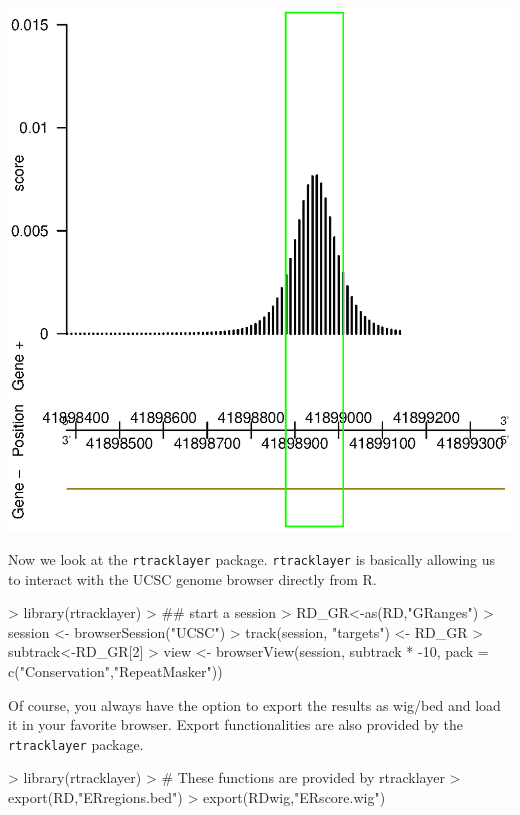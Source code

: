 \documentclass[12pt]{article}
\newcommand{\Rpackage}[1]{\texttt{#1}}
\begin{document}
\includegraphics{chipData_AD-Visualization-GenomeGraphs-cs}

Now we look at the \Rpackage{rtracklayer} package. \Rpackage{rtracklayer} is basically allowing us to interact with the UCSC genome browser directly from R. 
\begin{Schunk}
\begin{Sinput}
> library(rtracklayer)
> ## start a session
> RD_GR<-as(RD,"GRanges")
> session <- browserSession("UCSC")
> track(session, "targets") <- RD_GR
> subtrack<-RD_GR[2]
> view <- browserView(session, subtrack * -10, pack = c("Conservation","RepeatMasker"))
\end{Sinput}
\end{Schunk}

Of course, you always have the option to export the results as wig/bed and load it in your favorite browser. Export functionalities are also provided by the \texttt{rtracklayer} package.

\begin{Schunk}
\begin{Sinput}
> library(rtracklayer)
> # These functions are provided by rtracklayer
> export(RD,"ERregions.bed")
> export(RDwig,"ERscore.wig")
\end{Sinput}
\end{Schunk}
\end{document}
